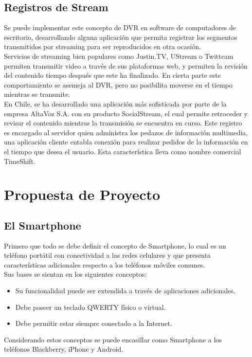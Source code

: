 \subsection{Registros de Stream}

Se puede implementar este concepto de DVR en software de computadores de escritorio, desarrollando alguna aplicación que permita registrar los segmentos transmitidos por streaming para ser reproducidos en otra ocasión. \\

	Servicios de streaming bien populares como Justin.TV, UStream o Twittcam permiten transmitir video a través de sus plataformas web, y permiten la revisión del contenido tiempo después que este ha finalizado. En cierta parte este comportamiento se asemeja al DVR, pero no posibilita moverse en el tiempo mientras se transmite.\\

En Chile, se ha desarrollado una aplicación más sofisticada por parte de la empresa AltaVoz S.A. con su producto SocialStream, el cual permite retroceder y revisar el contenido mientras la transmisión se encuentra en curso. Este registro es encargado al servidor quien administra los pedazos de información multimedia, una aplicación cliente entabla conexión para realizar pedidos de la información en el tiempo que desea el usuario.
Esta característica lleva como nombre comercial TimeShift.


\section{Propuesta de Proyecto}
\subsection{El Smartphone}
Primero que todo se debe definir el concepto de Smartphone, lo cual es un teléfono portátil con conectividad a las redes celulares y que presenta características adicionales respecto a los teléfonos móviles comunes.\\

Sus bases se sientan en los siguientes conceptos:
\begin{itemize}
\item Su funcionalidad puede ser extendida a través de aplicaciones adicionales.
\item Debe poseer un teclado QWERTY físico o virtual.
\item Debe permitir estar siempre conectado a la Internet.
\end{itemize}
Considerando estos conceptos se puede encasillar como Smartphone a los teléfonos Blackberry, iPhone y Android.\\

